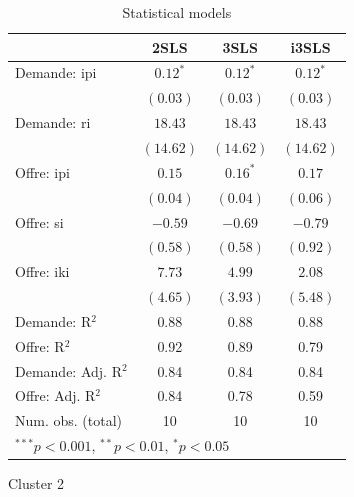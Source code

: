 \documentclass[11pt,]{article}
\begin{document}
\FloatBarrier

\begin{table}[!htbp]
\begin{center}
\begin{tabular}{l c c c }
\hline
 & 2SLS & 3SLS & i3SLS \\
\hline
Demande: ipi        & $0.12^{*}$ & $0.12^{*}$ & $0.12^{*}$ \\
                    & $(0.03)$   & $(0.03)$   & $(0.03)$   \\
Demande: ri         & $18.43$    & $18.43$    & $18.43$    \\
                    & $(14.62)$  & $(14.62)$  & $(14.62)$  \\
Offre: ipi          & $0.15$     & $0.16^{*}$ & $0.17$     \\
                    & $(0.04)$   & $(0.04)$   & $(0.06)$   \\
Offre: si           & $-0.59$    & $-0.69$    & $-0.79$    \\
                    & $(0.58)$   & $(0.58)$   & $(0.92)$   \\
Offre: iki          & $7.73$     & $4.99$     & $2.08$     \\
                    & $(4.65)$   & $(3.93)$   & $(5.48)$   \\
\hline
Demande: R$^2$      & 0.88       & 0.88       & 0.88       \\
Offre: R$^2$        & 0.92       & 0.89       & 0.79       \\
Demande: Adj. R$^2$ & 0.84       & 0.84       & 0.84       \\
Offre: Adj. R$^2$   & 0.84       & 0.78       & 0.59       \\
Num. obs. (total)   & 10         & 10         & 10         \\
\hline
\multicolumn{4}{l}{\scriptsize{$^{***}p<0.001$, $^{**}p<0.01$, $^*p<0.05$}}
\end{tabular}
\caption{Statistical models}
\label{table : 2sls, 3sls and fiml cluster 1}
\end{center}
\end{table}

\FloatBarrier

Cluster 2

\FloatBarrier
\end{document}
